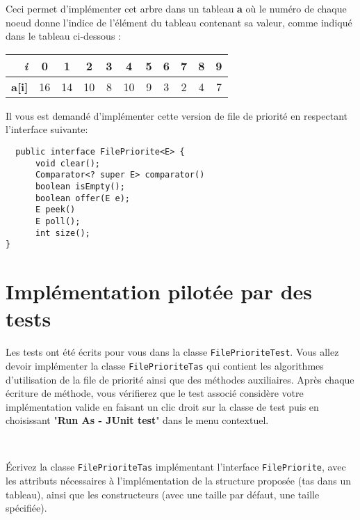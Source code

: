 \documentclass[iutinfo,a4paper,11pt]{ustl-tdtp}
\begin{document}
Ceci permet d'implémenter cet arbre dans un tableau \textbf{a} où le
numéro de chaque noeud donne l'indice de l'élément du tableau
contenant sa valeur, comme indiqué dans le tableau ci-dessous :

\begin{center}
\begin{tabular}{|r|c |c |c |c |c |c |c |c |c |c|}
  \hline
  \textit{i}      &  0  &  1  &   2  & 3 & 4  & 5 & 6 & 7 & 8 & 9 \\
  \hline
  \textbf{a[i]} & 16 & 14 & 10 & 8 & 10 & 9 & 3 & 2 & 4 & 7 \\
  \hline
\end{tabular}
\end{center}


\pagebreak

Il vous est demandé d'implémenter cette version de file de priorité en respectant l'interface suivante: 

\begin{verbatim}
  public interface FilePriorite<E> {
      void clear(); 
      Comparator<? super E> comparator()
      boolean isEmpty();
      boolean offer(E e);
      E peek()
      E poll();
      int size();
}

\end{verbatim}

\section{Implémentation pilotée par des tests}

Les tests ont été écrits pour vous dans la classe
\texttt{FilePrioriteTest}. Vous allez devoir implémenter la classe
\texttt{FilePrioriteTas} qui contient les algorithmes d'utilisation de
la file de priorité ainsi que des méthodes auxiliaires. Après chaque écriture de méthode, vous vérifierez que le test associé considère votre implémentation valide en faisant un clic droit sur la classe de test puis en choisissant "\textbf{Run As - JUnit test}" dans le menu contextuel. 

~\\

Écrivez la classe \texttt{FilePrioriteTas} implémentant l'interface
\texttt{FilePriorite}, avec les attributs nécessaires à
l'implémentation de la structure proposée (tas dans un tableau), ainsi
que les constructeurs (avec une taille par défaut, une taille
spécifiée).
\end{document}
